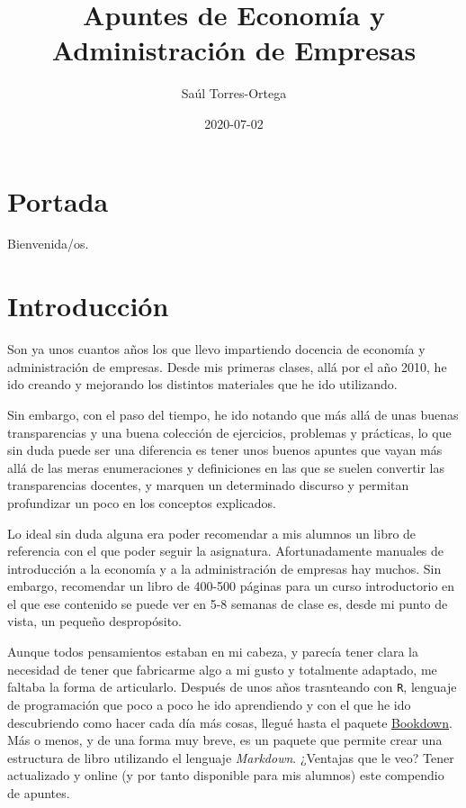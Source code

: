\documentclass[
]{krantz}
\title{Apuntes de Economía y Administración de Empresas}
\author{Saúl Torres-Ortega}
\date{2020-07-02}
\begin{document}
\maketitle

{
\setcounter{tocdepth}{2}
\tableofcontents
}
\hypertarget{portada}{%
\chapter*{Portada}\label{portada}}


Bienvenida/os.

\hypertarget{introducciuxf3n}{%
\chapter*{Introducción}\label{introducciuxf3n}}


Son ya unos cuantos años los que llevo impartiendo docencia de economía y administración de empresas. Desde mis primeras clases, allá por el año 2010, he ido creando y mejorando los distintos materiales que he ido utilizando.

Sin embargo, con el paso del tiempo, he ido notando que más allá de unas buenas transparencias y una buena colección de ejercicios, problemas y prácticas, lo que sin duda puede ser una diferencia es tener unos buenos apuntes que vayan más allá de las meras enumeraciones y definiciones en las que se suelen convertir las transparencias docentes, y marquen un determinado discurso y permitan profundizar un poco en los conceptos explicados.

Lo ideal sin duda alguna era poder recomendar a mis alumnos un libro de referencia con el que poder seguir la asignatura. Afortunadamente manuales de introducción a la economía y a la administración de empresas hay muchos. Sin embargo, recomendar un libro de 400-500 páginas para un curso introductorio en el que ese contenido se puede ver en 5-8 semanas de clase es, desde mi punto de vista, un pequeño despropósito.

Aunque todos pensamientos estaban en mi cabeza, y parecía tener clara la necesidad de tener que fabricarme algo a mi gusto y totalmente adaptado, me faltaba la forma de articularlo. Después de unos años trasnteando con \texttt{R}, lenguaje de programación que poco a poco he ido aprendiendo y con el que he ido descubriendo como hacer cada día más cosas, llegué hasta el paquete \href{https://bookdown.org/}{Bookdown}. Más o menos, y de una forma muy breve, es un paquete que permite crear una estructura de libro utilizando el lenguaje \emph{Markdown}. ¿Ventajas que le veo? Tener actualizado y online (y por tanto disponible para mis alumnos) este compendio de apuntes.
\end{document}
